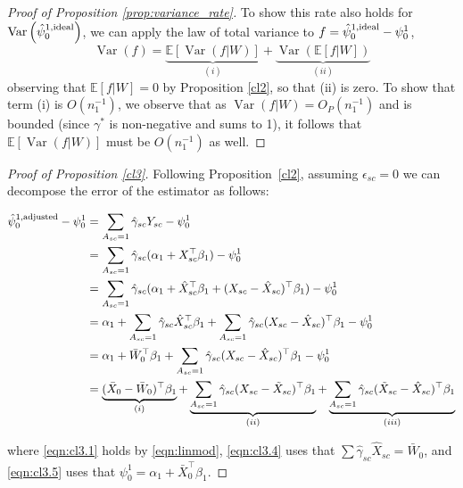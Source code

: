 \begin{proof}[Proof of Proposition \ref{prop:variance_rate}]
To show this rate also holds for $\operatorname{Var}\left(\hat{\psi}_0^{1,\textup{ideal}}\right)$, we can apply the law of total variance to $f = \hat{\psi}_0^{1,\textup{ideal}} - \psi_0^1$, %
\[ \operatorname{Var}(f) = \underbrace{\mathbb{E}[\operatorname{Var}(f|W)]}_{(i)} + \underbrace{\operatorname{Var}(\mathbb{E}[f|W])}_{(ii)} \]
observing that $\mathbb{E}[f|W] = 0$ by Proposition \ref{cl2}, so that (ii) is zero. To show that term (i) is $O(n_1^{-1})$, we observe that as $\operatorname{Var}(f|W) = O_P(n_1^{-1})$ and is bounded (since $\gamma^*$ is non-negative and sums to 1), it follows that  $\mathbb{E}[ \operatorname{Var}(f|W)]$ must be $O(n_1^{-1})$ as well.
\end{proof}

\begin{proof}[Proof of Proposition \ref{cl3}]
Following Proposition~\ref{cl2}, assuming $\epsilon_{sc}=0$ we can decompose the error of the estimator as follows:

\begin{align}
\nonumber    \hat{\psi}^{1,\textup{adjusted}}_0 - \psi_0^1 &= \sum_{A_{sc}=1} \hat{\gamma}_{sc} Y_{sc} - \psi_0^1 \\
    & = \sum_{A_{sc}=1} \hat{\gamma}_{sc} (\alpha_1 + X_{sc}^\top \beta_1) - \psi_0^1 \label{eqn:cl3.1}\\
    \nonumber & = \sum_{A_{sc}=1} \hat{\gamma}_{sc} (\alpha_1 + \hat{X}_{sc}^\top \beta_1 + (X_{sc} - \hat{X}_{sc})^\top \beta_1 ) - \psi_0^1 \\
    \nonumber & = \alpha_1 + \sum_{A_{sc}=1} \hat{\gamma}_{sc} \hat{X}_{sc}^\top \beta_1 + \sum_{A_{sc}=1} \hat{\gamma}_{sc}(X_{sc} - \hat{X}_{sc})^\top \beta_1  - \psi_0^1 \\
    & = \alpha_1 + \bar{W}_0^\top \beta_1 + \sum_{A_{sc}=1} \hat{\gamma}_{sc}(X_{sc} - \hat{X}_{sc})^\top \beta_1  - \psi_0^1 \label{eqn:cl3.4}\\
    & = \underbrace{(\bar{X}_0 - \bar{W}_0)^\top \beta_1}_{(i)} + \underbrace{\sum_{A_{sc}=1} \hat{\gamma}_{sc}(X_{sc} - \tilde{X}_{sc})^\top \beta_1}_{(ii)} + \underbrace{\sum_{A_{sc}=1} \hat{\gamma}_{sc} (\tilde{X}_{sc} - \hat{X}_{sc})^\top \beta_1}_{(iii)} \label{eqn:cl3.5}
\end{align}

where \eqref{eqn:cl3.1} holds by \eqref{eqn:linmod}, \eqref{eqn:cl3.4} uses that $\sum \hat{\gamma}_{sc} \hat{X}_{sc} = \bar{W}_0$, and \eqref{eqn:cl3.5} uses that $\psi_{0}^1 = \alpha_1 + \bar{X}_0^\top \beta_1$.


\end{proof}
